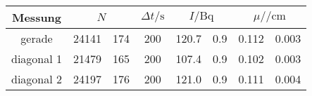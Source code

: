 \label{tab:tabWürfel3}
	\begin{tabular}{cS[table-format=5.0]@{${}\pm{}$}S[table-format=3.0]S[table-format=3.0]S[table-format=3.1]@{${}\pm{}$}S[table-format=1.1]S[table-format=1.3]@{${}\pm{}$}S[table-format=1.3]}
		\toprule
		{Messung} &  & {$\Delta t/\si{\second}$} &  &  \\
		\midrule
		{gerade}     & 24141 & 174 & 200 & 120.7 & 0.9 & 0.112 & 0.003 \\
		{diagonal 1} & 21479 & 165 & 200 & 107.4 & 0.9 & 0.102 & 0.003 \\
		{diagonal 2} & 24197 & 176 & 200 & 121.0 & 0.9 & 0.111 & 0.004 \\
		\bottomrule
	\end{tabular}

